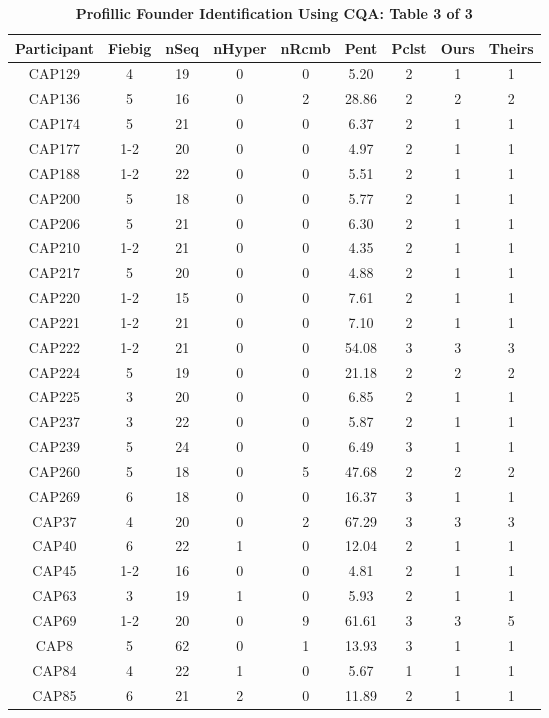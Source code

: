 \documentclass[preprint,12pt,authoryear]{elsarticle}
\begin{document}
\begin{table}
\centering
\begin{tabular}{cc | ccc | cc | cc}
  \hline
Participant & Fiebig & nSeq & nHyper & nRcmb & Pent & Pclst & Ours & Theirs \\ 
  \hline
  CAP129 &  4 &  19 &   0 &   0 & 5.20 &   2 & 1 &   1 \\ 
  CAP136 &  5 &  16 &   0 &   2 & 28.86 &   2 & 2 &   2 \\ 
  CAP174 &  5 &  21 &   0 &   0 & 6.37 &   2 & 1 &   1 \\ 
  CAP177 &  1-2 &  20 &   0 &   0 & 4.97 &   2 & 1 &   1 \\ 
  CAP188 &  1-2 &  22 &   0 &   0 & 5.51 &   2 & 1 &   1 \\ 
  CAP200 &  5 &  18 &   0 &   0 & 5.77 &   2 & 1 &   1 \\ 
  CAP206 &  5 &  21 &   0 &   0 & 6.30 &   2 & 1 &   1 \\ 
  CAP210 &  1-2 &  21 &   0 &   0 & 4.35 &   2 & 1 &   1 \\ 
  CAP217 &  5 &  20 &   0 &   0 & 4.88 &   2 & 1 &   1 \\ 
  CAP220 &  1-2 &  15 &   0 &   0 & 7.61 &   2 & 1 &   1 \\ 
  CAP221 &  1-2 &  21 &   0 &   0 & 7.10 &   2 & 1 &   1 \\ 
  CAP222 &  1-2 &  21 &   0 &   0 & 54.08 &   3 & 3 &   3 \\ 
  CAP224 &  5 &  19 &   0 &   0 & 21.18 &   2 & 2 &   2 \\ 
  CAP225 &  3 &  20 &   0 &   0 & 6.85 &   2 & 1 &   1 \\ 
  CAP237 &  3 &  22 &   0 &   0 & 5.87 &   2 & 1 &   1 \\ 
  CAP239 &  5 &  24 &   0 &   0 & 6.49 &   3 & 1 &   1 \\ 
  CAP260 &  5 &  18 &   0 &   5 & 47.68 &   2 & 2 &   2 \\ 
  CAP269 &  6 &  18 &   0 &   0 & 16.37 &   3 & 1 &   1 \\ 
  CAP37 &  4 &  20 &   0 &   2 & 67.29 &   3 & 3 &   3 \\ 
  CAP40 &  6 &  22 &   1 &   0 & 12.04 &   2 & 1 &   1 \\ 
  CAP45 &  1-2 &  16 &   0 &   0 & 4.81 &   2 & 1 &   1 \\ 
  CAP63 &  3 &  19 &   1 &   0 & 5.93 &   2 & 1 &   1 \\ 
  CAP69 &  1-2 &  20 &   0 &   9 & 61.61 &   3 & 3 &   5 \\ 
  CAP8  &  5 &  62 &   0 &   1 & 13.93 &   3 & 1 &   1 \\ 
  CAP84 &  4 &  22 &   1 &   0 & 5.67 &   1 & 1 &   1 \\ 
  CAP85 &  6 &  21 &   2 &   0 & 11.89 &   2 & 1 &   1 \\ 
   \hline
\end{tabular}
\caption{\textbf{Profillic Founder Identification Using CQA: Table 3 of 3}}
\label{tbl:AbrahamsFoundersVsProfillicFounders-c}
\end{table}
\end{document}
